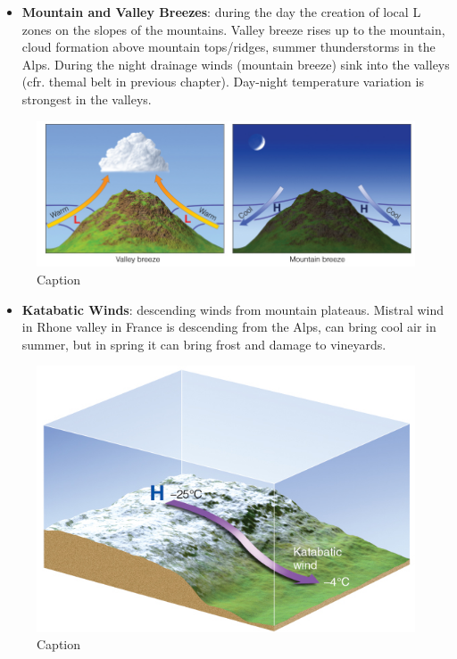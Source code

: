 \documentclass[12pt,oneside]{book}
\providecommand{\tightlist}{%
  \setlength{\itemsep}{0pt}\setlength{\parskip}{0pt}}
\begin{document}
\begin{itemize}
\tightlist
\item
  \textbf{Mountain and Valley Breezes}: during the day the creation of
  local L zones on the slopes of the mountains. Valley breeze rises up
  to the mountain, cloud formation above mountain tops/ridges, summer
  thunderstorms in the Alps. During the night drainage winds (mountain
  breeze) sink into the valleys (cfr. themal belt in previous chapter).
  Day-night temperature variation is strongest in the valleys.
\end{itemize}

\begin{figure}

{\centering \includegraphics[width=0.6\linewidth]{figures/Figure426} 

}

\caption{Caption}\label{fig:Mountain}
\end{figure}

\begin{itemize}
\tightlist
\item
  \textbf{Katabatic Winds}: descending winds from mountain plateaus.
  Mistral wind in Rhone valley in France is descending from the Alps,
  can bring cool air in summer, but in spring it can bring frost and
  damage to vineyards.
\end{itemize}

\begin{figure}

{\centering \includegraphics[width=0.6\linewidth]{figures/Figure427} 

}

\caption{Caption}\label{fig:Katabatic}
\end{figure}
\end{document}
